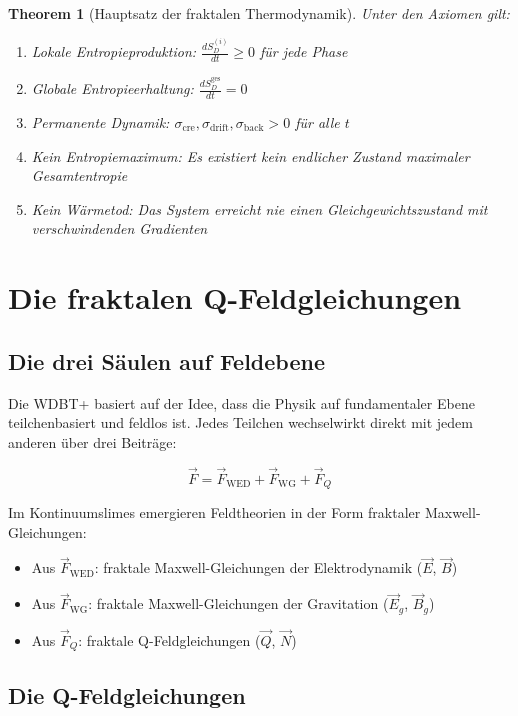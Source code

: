 \documentclass[12pt,a4paper]{article}
\newtheorem{theorem}{Theorem}[section]
\begin{document}
\begin{theorem}[Hauptsatz der fraktalen Thermodynamik]
Unter den Axiomen gilt:
\begin{enumerate}
\item Lokale Entropieproduktion: $\frac{dS_D^{(i)}}{dt} \geq 0$ für jede Phase
\item Globale Entropieerhaltung: $\frac{dS_D^{\text{ges}}}{dt} = 0$
\item Permanente Dynamik: $\sigma_{\text{cre}}, \sigma_{\text{drift}}, \sigma_{\text{back}} > 0$ für alle $t$
\item Kein Entropiemaximum: Es existiert kein endlicher Zustand maximaler Gesamtentropie
\item Kein Wärmetod: Das System erreicht nie einen Gleichgewichtszustand mit verschwindenden Gradienten
\end{enumerate}
\end{theorem}

\section{Die fraktalen Q-Feldgleichungen}

\subsection{Die drei Säulen auf Feldebene}

Die WDBT+ basiert auf der Idee, dass die Physik auf fundamentaler Ebene teilchenbasiert und feldlos ist. Jedes Teilchen wechselwirkt direkt mit jedem anderen über drei Beiträge:

\begin{equation}
\vec{F} = \vec{F}_{\text{WED}} + \vec{F}_{\text{WG}} + \vec{F}_Q
\end{equation}

Im Kontinuumslimes emergieren Feldtheorien in der Form fraktaler Maxwell-\\Gleichungen:
\begin{itemize}
\item Aus $\vec{F}_{\text{WED}}$: fraktale Maxwell-Gleichungen der Elektrodynamik ($\vec{E}$, $\vec{B}$)
\item Aus $\vec{F}_{\text{WG}}$: fraktale Maxwell-Gleichungen der Gravitation ($\vec{E}_g$, $\vec{B}_g$)
\item Aus $\vec{F}_Q$: fraktale Q-Feldgleichungen ($\vec{Q}$, $\vec{N}$)
\end{itemize}

\subsection{Die Q-Feldgleichungen}
\end{document}
